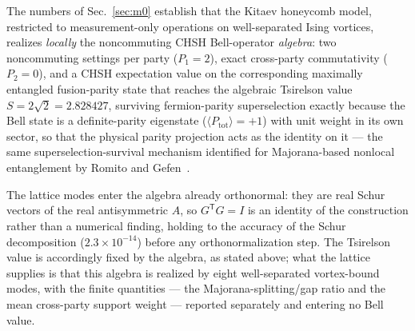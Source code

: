 \documentclass[aps,pra,twocolumn,superscriptaddress,floatfix,nofootinbib]{revtex4-2}
\begin{document}
The numbers of Sec.~\ref{sec:m0} establish that the Kitaev honeycomb
model, restricted to measurement-only operations on well-separated
Ising vortices, realizes \emph{locally} the noncommuting CHSH
Bell-operator \emph{algebra}: two noncommuting settings per party
($P_1=2$), exact cross-party commutativity ($P_2=0$), and a CHSH
expectation value on the corresponding maximally entangled fusion-parity
state that reaches the algebraic Tsirelson value
$S=2\sqrt2=2.828427$, surviving fermion-parity superselection exactly
because the Bell state is a definite-parity eigenstate
($\langle P_{\mathrm{tot}}\rangle=+1$) with unit weight in its own
sector, so that the physical parity projection acts as the identity on
it --- the same superselection-survival mechanism identified for
Majorana-based nonlocal entanglement by Romito and
Gefen~\cite{RomitoGefen2017}.

The lattice modes enter the algebra already orthonormal: they are real
Schur vectors of the real antisymmetric $\hat A$, so
$G^\mathsf{T}G = I$ is an identity of the construction rather than a
numerical finding, holding to the accuracy of the Schur decomposition
($2.3\times10^{-14}$) before any orthonormalization step. The Tsirelson
value is accordingly fixed by the algebra, as stated above; what the
lattice supplies is that this algebra is realized by eight
well-separated vortex-bound modes, with the finite quantities --- the
Majorana-splitting/gap ratio and the mean cross-party support weight
--- reported separately and entering no Bell value.
\end{document}
